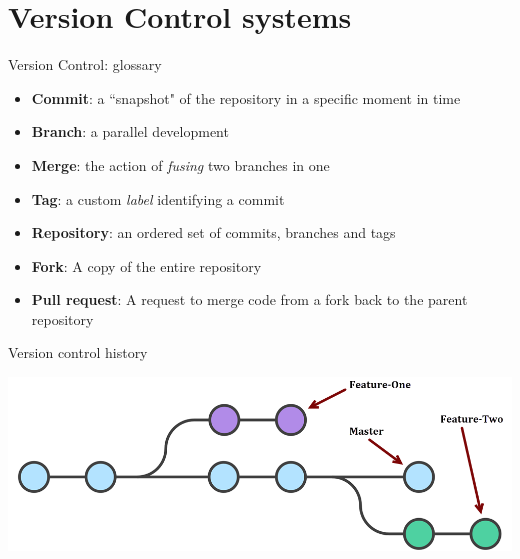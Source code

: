 \section{Version Control systems}

\begin{frame}[fragile]{Version Control: glossary}

\begin{itemize}
  \item \textbf{Commit}: a ``snapshot" of the repository in a specific moment in time
  \item \textbf{Branch}: a parallel development
  \item \textbf{Merge}: the action of \textit{fusing} two branches in one
  \item \textbf{Tag}: a custom \textit{label} identifying a commit
  \item \textbf{Repository}: an ordered set of commits, branches and tags
  \item \textbf{Fork}: A copy of the entire repository
  \item \textbf{Pull request}: A request to merge code from a fork back to the
  parent repository
\end{itemize}

\end{frame}


\begin{frame}[fragile]{Version control history}

\begin{center}
\includegraphics[width=\textwidth]{vcs-history}
\end{center}

\end{frame}


%
%
%
%
%
%


